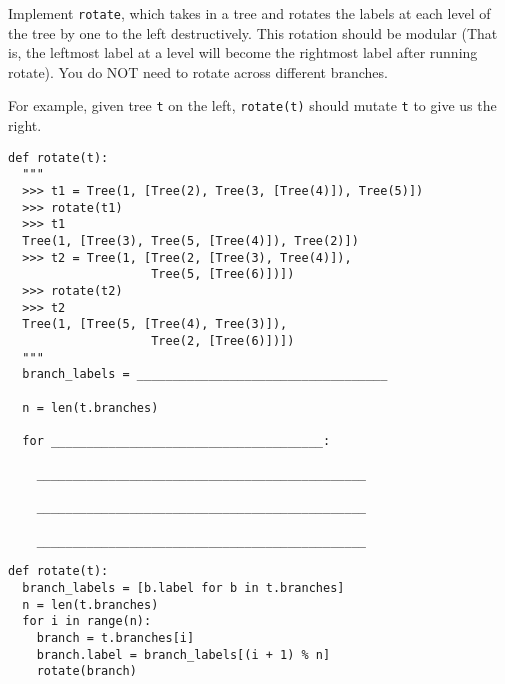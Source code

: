 \begin{blocksection}
\question Implement \texttt{rotate}, which takes in a tree and rotates the labels at each level of the tree by one to the left destructively. This rotation should be modular (That is, the leftmost label at a level will become the rightmost label after running rotate). You do NOT need to rotate across different branches.

For example, given tree \texttt{t} on the left, \texttt{rotate(t)} should mutate \texttt{t} to give us the right.


\begin{lstlisting}
def rotate(t):
  """
  >>> t1 = Tree(1, [Tree(2), Tree(3, [Tree(4)]), Tree(5)])
  >>> rotate(t1)
  >>> t1
  Tree(1, [Tree(3), Tree(5, [Tree(4)]), Tree(2)])
  >>> t2 = Tree(1, [Tree(2, [Tree(3), Tree(4)]), 
                    Tree(5, [Tree(6)])])
  >>> rotate(t2)
  >>> t2
  Tree(1, [Tree(5, [Tree(4), Tree(3)]), 
                    Tree(2, [Tree(6)])])
  """
  branch_labels = ___________________________________

  n = len(t.branches)

  for ______________________________________:

    ______________________________________________

    ______________________________________________
    
    ______________________________________________ 
\end{lstlisting}
\end{blocksection}

\begin{blocksection}
\begin{solution}
\begin{lstlisting}
def rotate(t):
  branch_labels = [b.label for b in t.branches]
  n = len(t.branches)
  for i in range(n):
    branch = t.branches[i]
    branch.label = branch_labels[(i + 1) % n]
    rotate(branch)
\end{lstlisting}
\end{solution}
\end{blocksection}

